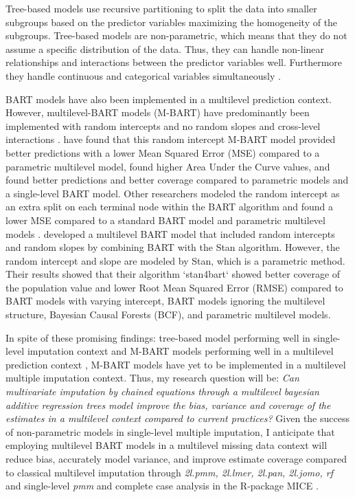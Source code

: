 \documentclass[10pt, a4paper, titlepage]{article}
\begin{document}
Tree-based models use recursive partitioning to split the data into smaller subgroups based on the predictor variables maximizing the homogeneity of the subgroups. Tree-based models are non-parametric, which means that they do not assume a specific distribution of the data. Thus, they can handle non-linear relationships and interactions between the predictor variables well. Furthermore they handle continuous and categorical variables simultaneously \citep{hill2020, burgette2010, lin2019, chipman2010, james2021, salditt2023, breiman1984}.

BART models have also been implemented in a multilevel prediction context. However, multilevel-BART models (M-BART) have predominantly been implemented with random intercepts and no random slopes and cross-level interactions \citep{chen2020, wagner2020, tan2016, wundervald2022}. \citet{wagner2020} have found that this random intercept M-BART model provided better predictions with a lower Mean Squared Error (MSE) compared to a parametric multilevel model, \citet{tan2016} found higher Area Under the Curve values, and \citet{chen2020} found better predictions and better coverage compared to parametric models and a single-level BART model. Other researchers modeled the random intercept as an extra split on each terminal node within the BART algorithm and found a lower MSE compared to a standard BART model and parametric multilevel models \citep{wundervald2022}. \citet{dorie2022} developed a multilevel BART model that included random intercepts and random slopes by combining BART with the Stan algorithm. However, the random intercept and slope are modeled by Stan, which is a parametric method. Their results showed that their algorithm `stan4bart` showed better coverage of the population value and lower Root Mean Squared Error (RMSE) compared to BART models with varying intercept, BART models ignoring the multilevel structure, Bayesian Causal Forests (BCF), and parametric multilevel models.

In spite of these promising findings: tree-based model performing well in single-level imputation context \citep{burgette2010, xu2016, silva2022, stekhoven2012, waljee2013} and M-BART models performing well in a multilevel prediction context \citep{chen2020, wagner2020, tan2016, wundervald2022, dorie2022}, M-BART models have yet to be implemented in a multilevel multiple imputation context. Thus, my research question will be: \textit{Can multivariate imputation by chained equations through a multilevel bayesian additive regression trees model improve the bias, variance and coverage of the estimates in a multilevel context compared to current practices?} Given the success of non-parametric models in single-level multiple imputation, I anticipate that employing multilevel BART models in a multilevel missing data context will reduce bias, accurately model variance, and improve estimate coverage compared to classical multilevel imputation through \textit{2l.pmm, 2l.lmer, 2l.pan, 2l.jomo, rf} and single-level \textit{pmm} and complete case analysis in the R-package MICE \citep{buuren2011}.
\end{document}
